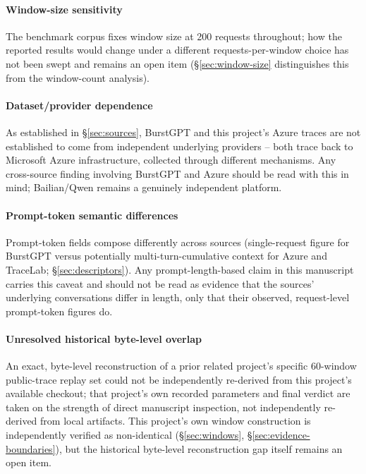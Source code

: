 \paragraph{Window-size sensitivity} The benchmark corpus fixes window size
at 200 requests throughout; how the reported results would change under a
different requests-per-window choice has not been swept and remains an open
item (\S\ref{sec:window-size} distinguishes this from the window-count
analysis).

\paragraph{Dataset/provider dependence} As established in
\S\ref{sec:sources}, BurstGPT and this project's Azure traces are not
established to come from independent underlying providers -- both trace
back to Microsoft Azure infrastructure, collected through different
mechanisms. Any cross-source finding involving BurstGPT and Azure should be
read with this in mind; Bailian/Qwen remains a genuinely independent
platform.

\paragraph{Prompt-token semantic differences} Prompt-token fields compose
differently across sources (single-request figure for BurstGPT versus
potentially multi-turn-cumulative context for Azure and TraceLab;
\S\ref{sec:descriptors}). Any prompt-length-based claim in this manuscript
carries this caveat and should not be read as evidence that the sources'
underlying conversations differ in length, only that their observed,
request-level prompt-token figures do.

\paragraph{Unresolved historical byte-level overlap} An exact,
byte-level reconstruction of a prior related project's specific 60-window
public-trace replay set could not be independently re-derived from this
project's available checkout; that project's own recorded parameters and
final verdict are taken on the strength of direct manuscript inspection,
not independently re-derived from local artifacts. This project's own
window construction is independently verified as non-identical
(\S\ref{sec:windows}, \S\ref{sec:evidence-boundaries}), but the historical
byte-level reconstruction gap itself remains an open item.


